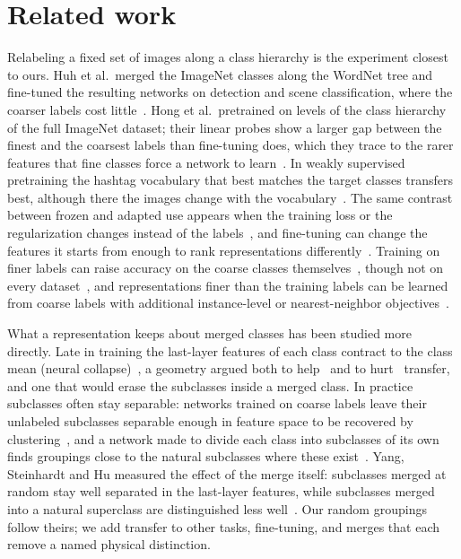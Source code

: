 \section{Related work}\label{sec:related}

Relabeling a fixed set of images along a class hierarchy is the experiment closest to ours.
Huh et al.\ merged the ImageNet classes along the WordNet tree and fine-tuned the resulting networks on detection and
scene classification, where the coarser labels cost little~\cite{huh}.
Hong et al.\ pretrained on levels of the class hierarchy of the full ImageNet dataset; their linear probes show a
larger gap between the finest and the coarsest labels than fine-tuning does, which they trace to the rarer features
that fine classes force a network to learn~\cite{hong}.
In weakly supervised pretraining the hashtag vocabulary that best matches the target classes transfers best, although
there the images change with the vocabulary~\cite{mahajan}.
The same contrast between frozen and adapted use appears when the training loss or the regularization changes instead
of the labels~\cite{kornblith,kornblithtransfer}, and fine-tuning can change the features it starts from enough to rank
representations differently~\cite{kumar}.
Training on finer labels can raise accuracy on the coarse classes themselves~\cite{chen}, though not on every
dataset~\cite{pirovano}, and representations finer than the training labels can be learned from coarse labels with
additional instance-level or nearest-neighbor objectives~\cite{grafit,xucoarse}.

What a representation keeps about merged classes has been studied more directly.
Late in training the last-layer features of each class contract to the class mean (neural collapse)~\cite{papyan},
a geometry argued both to help~\cite{galanti} and to hurt~\cite{hui} transfer, and one that would erase the subclasses
inside a merged class.
In practice subclasses often stay separable: networks trained on coarse labels leave their unlabeled subclasses
separable enough in feature space to be recovered by clustering~\cite{sohoni}, and a network made to divide each class
into subclasses of its own finds groupings close to the natural subclasses where these exist~\cite{subclassdistill}.
Yang, Steinhardt and Hu measured the effect of the merge itself: subclasses merged at random stay well separated in the
last-layer features, while subclasses merged into a natural superclass are distinguished less well~\cite{yang}.
Our random groupings follow theirs; we add transfer to other tasks, fine-tuning, and merges that each remove a named
physical distinction.

